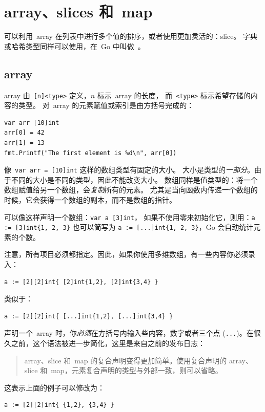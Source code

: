 \section{array、slices 和~map}
\label{sec:arrays}
可以利用~array 在列表中进行多个值的排序，或者使用更加灵活的：slice。
字典或哈希类型同样可以使用，在~Go 中叫做~。

\subsection{array}
array 由~\verb|[n]<type>| 定义，$n$ 标示~array 的长度，
而~\verb|<type>| 标示希望存储的内容的类型。
对~array 的元素赋值或索引是由方括号完成的：
\begin{lstlisting}
var arr [10]int
arr[0] = 42
arr[1] = 13
fmt.Printf("The first element is %d\n", arr[0])
\end{lstlisting}
像~\lstinline{var arr = [10]int} 这样的数组类型有固定的大小。
大小是类型的\emph{一部分}。由于不同的大小是不同的类型，因此不能改变大小。
数组同样是值类型的：将一个数组赋值给另一个数组，会\emph{复制}所有的元素。
尤其是当向函数内传递一个数组的时候，它会获得一个数组的副本，而不是数组的指针。

可以像这样声明一个数组：\lstinline{var a [3]int}，
如果不使用零来初始化它，则用：\lstinline|a := [3]int{1, 2, 3}| 也可以简写为
\lstinline|a := [...]int{1, 2, 3}|，Go 会自动统计元素的个数。

注意，所有项目必须都指定。因此，如果你使用多维数组，有一些内容你必须录入：
\begin{lstlisting}
a := [2][2]int{ [2]int{1,2}, [2]int{3,4} }
\end{lstlisting}
类似于：
\begin{lstlisting}
a := [2][2]int{ [...]int{1,2}, [...]int{3,4} }
\end{lstlisting}
声明一个~array 时，你\emph{必须}在方括号内输入些内容，数字或者三个点
(\verb|...|)。在很久之前，这个语法被进一步简化，这里是来自之前的发布日志：
\begin{quote}
array、slice 和~map 的复合声明变得更加简单。使用复合声明的
array、slice 和~map，元素复合声明的类型与外部一致，则可以省略。
\end{quote}
这表示上面的例子可以修改为：
\begin{lstlisting}
a := [2][2]int{ {1,2}, {3,4} }
\end{lstlisting}

